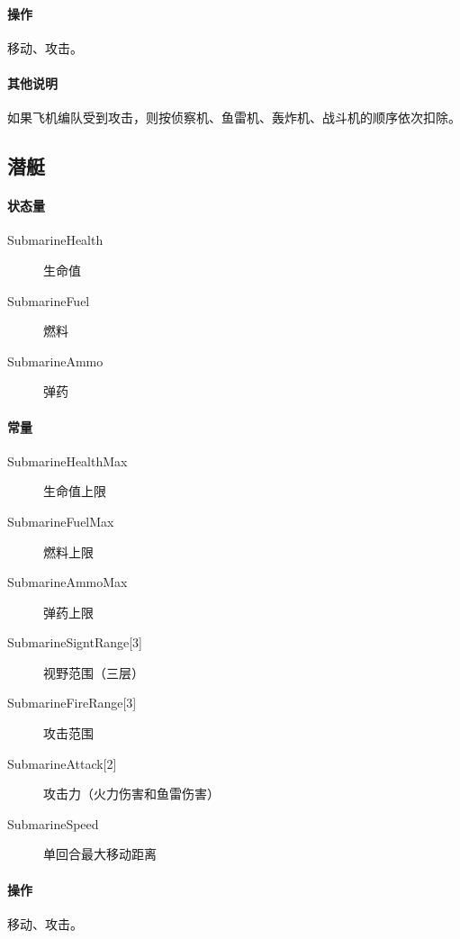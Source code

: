 \documentclass[11pt,a4paper]{article}
\begin{document}
      \paragraph{操作} 移动、攻击。
      \paragraph{其他说明}
        如果飞机编队受到攻击，则按侦察机、鱼雷机、轰炸机、战斗机的顺序依次扣除。


    \subsection{潜艇}
      \paragraph{状态量}
        \begin{minipage}[t]{0.8\textwidth}
          \begin{description}
            \item[SubmarineHealth] 生命值
            \item[SubmarineFuel] 燃料
            \item[SubmarineAmmo] 弹药
          \end{description}
        \end{minipage}

      \paragraph{常量}
        \begin{minipage}[t]{0.8\textwidth}
          \begin{description}
            \item[SubmarineHealthMax] 生命值上限
            \item[SubmarineFuelMax] 燃料上限
            \item[SubmarineAmmoMax] 弹药上限
            \item[{SubmarineSigntRange[3]}] 视野范围（三层）
            \item[{SubmarineFireRange[3]}] 攻击范围
            \item[{SubmarineAttack[2]}] 攻击力（火力伤害和鱼雷伤害）
            \item[SubmarineSpeed] 单回合最大移动距离
          \end{description}
        \end{minipage}

      \paragraph{操作} 移动、攻击。
\end{document}
